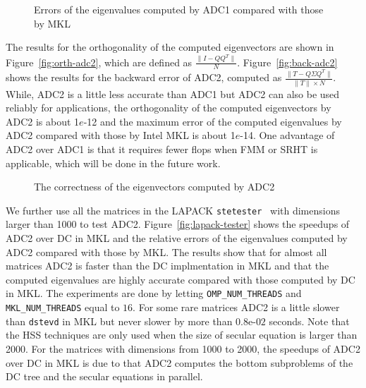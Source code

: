 \documentclass[times]{nlaauth}
\begin{document}
\begin{figure}[ptbh]
\centering
{}
\caption{Errors of the eigenvalues computed by ADC1 compared with those by MKL}\label{fig:Ex1-errors}\end{figure}

The results for the orthogonality of the computed eigenvectors are shown in Figure~\ref{fig:orth-adc2}, which are defined as $\frac{\|I-QQ^T\|}{N}$.
Figure~\ref{fig:back-adc2} shows the results for the backward error of ADC2, computed as $\frac{\|T-Q\Sigma Q^T\|}{\|T\|\times N}$.
While, ADC2 is a little less accurate than ADC1 but ADC2 can also be used reliably for applications,
the orthogonality of the computed eigenvectors by ADC2 is about 1$e$-12 and the maximum error
of the computed eigenvalues by ADC2 compared with those by Intel MKL is about 1$e$-14.
One advantage of ADC2 over ADC1 is that it requires fewer flops when FMM or SRHT is applicable,
which will be done in the future work.

\begin{figure}[ptbh]
\centering
{}
\caption{The correctness of the eigenvectors computed by ADC2}\label{fig:orth-check}
\end{figure}

We further use all the matrices in the LAPACK \texttt{stetester}~\cite{A880} with dimensions larger than
1000 to test ADC2.
Figure~\ref{fig:lapack-tester} shows the speedups of ADC2 over DC in MKL and the relative errors
of the eigenvalues computed by ADC2 compared with those by MKL.
The results show that for almost all matrices ADC2 is faster than the DC implmentation in MKL
and that the computed eigenvalues are highly accurate compared with
those computed by DC in MKL.
The experiments are done by letting \texttt{OMP\_NUM\_THREADS} and \texttt{MKL\_NUM\_THREADS}
equal to $16$.
For some rare matrices ADC2 is a little slower than \texttt{dstevd} in MKL but never slower by
more than $0.8$e-$02$ seconds.
Note that the HSS techniques are only used when the size of secular equation
is larger than 2000.
For the matrices with dimensions from 1000 to 2000, the speedups of ADC2
over DC in MKL is due to that ADC2 computes the bottom subproblems of the
DC tree and the secular equations in parallel.
\end{document}
